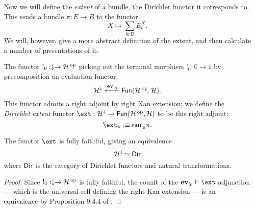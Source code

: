 Now we will define the \emph{extent} of a bundle, the Dirichlet functor it
corresponds to. This sends a bundle
$\pi : E \to B$ to the functor
$$X \mapsto \sum_{b : B} E_b^X.$$
We will, however, give a more abstract definition of the extent, and then
calculate a number of presentations of it.

\begin{defn}
  The functor $!_0 : \downarrow \to \operatorname{\mathcal{H}}\operatorname{^\text{op}}$ picking out the terminal morphism
  $!_0 : 0 \to 1$ by precomposition an evaluation functor
  $$\operatorname{\mathcal{H}}^{\downarrow} \xleftarrow{\operatorname{\textbf{ev}}_{!_0}} \operatorname{\mathsf{{Fun}}}(\operatorname{\mathcal{H}}\operatorname{^\text{op}}, \operatorname{\mathcal{H}}).$$
  This functor admits a right adjoint by right Kan extension; we define the
  \emph{Dirichlet extent} functor $\ext : \Ha^{\downarrow} \to \Fun(\Ha\op,
  \Ha)$ to be this right adjoint:
  $$\ext_{\pi} :\equiv \term{ran}_{!_0} \pi.$$
\end{defn}

\begin{prop}
  The functor $\ext$ is fully faithful, giving an equivalence
  $$\operatorname{\mathcal{H}}^{\downarrow} \simeq \operatorname{\mathsf{{Dir}}}$$
  where $\operatorname{\mathsf{{Dir}}}$ is the category of Dirichlet functors and natural transformations.
\end{prop}
\begin{proof}
Since $!_0 : \downarrow \to \operatorname{\mathcal{H}}\operatorname{^\text{op}}$ is fully faithful, the counit of the
$\ev_{!_0} \vdash \ext$ adjunction --- which is the universal cell defining the
right Kan extension --- is an equivalence by Proposition 9.4.4 of \cite{RV:Elements}. 
\end{proof}

